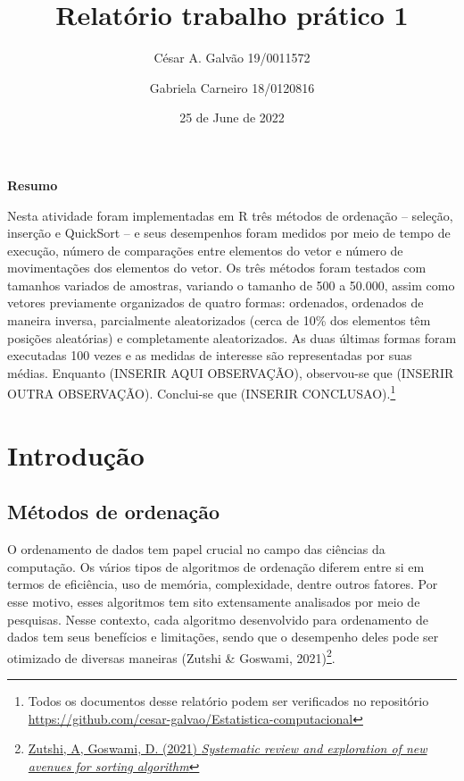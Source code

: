 \documentclass[
]{article}
\title{Relatório trabalho prático 1}
\author{César A. Galvão 19/0011572 \and Gabriela Carneiro 18/0120816}
\date{25 de June de 2022}
\begin{document}
\maketitle

\newpage{}

{
\setcounter{tocdepth}{2}
\tableofcontents
}
\let\oldsection\section
\renewcommand\section{\clearpage\oldsection}

\begin{center} 

\textbf{Resumo} 

\end{center}

Nesta atividade foram implementadas em R três métodos de ordenação --
seleção, inserção e QuickSort -- e seus desempenhos foram medidos por
meio de tempo de execução, número de comparações entre elementos do
vetor e número de movimentações dos elementos do vetor. Os três métodos
foram testados com tamanhos variados de amostras, variando o tamanho de
500 a 50.000, assim como vetores previamente organizados de quatro
formas: ordenados, ordenados de maneira inversa, parcialmente
aleatorizados (cerca de 10\% dos elementos têm posições aleatórias) e
completamente aleatorizados. As duas últimas formas foram executadas 100
vezes e as medidas de interesse são representadas por suas médias.
Enquanto (INSERIR AQUI OBSERVAÇÃO), observou-se que (INSERIR OUTRA
OBSERVAÇÃO). Conclui-se que (INSERIR CONCLUSAO).\footnote{Todos os
  documentos desse relatório podem ser verificados no repositório
  \url{https://github.com/cesar-galvao/Estatistica-computacional}}

\hypertarget{introduuxe7uxe3o}{%
\section{Introdução}\label{introduuxe7uxe3o}}

\hypertarget{muxe9todos-de-ordenauxe7uxe3o}{%
\subsection{Métodos de ordenação}\label{muxe9todos-de-ordenauxe7uxe3o}}

O ordenamento de dados tem papel crucial no campo das ciências da
computação. Os vários tipos de algoritmos de ordenação diferem entre si
em termos de eficiência, uso de memória, complexidade, dentre outros
fatores. Por esse motivo, esses algoritmos tem sito extensamente
analisados por meio de pesquisas. Nesse contexto, cada algoritmo
desenvolvido para ordenamento de dados tem seus benefícios e limitações,
sendo que o desempenho deles pode ser otimizado de diversas maneiras
(Zutshi \& Goswami, 2021)\footnote{\href{https://www.sciencedirect.com/science/article/pii/S2667096821000355}{Zutshi,
  A, Goswami, D. (2021) \emph{Systematic review and exploration of new
  avenues for sorting algorithm}}}.
\end{document}
